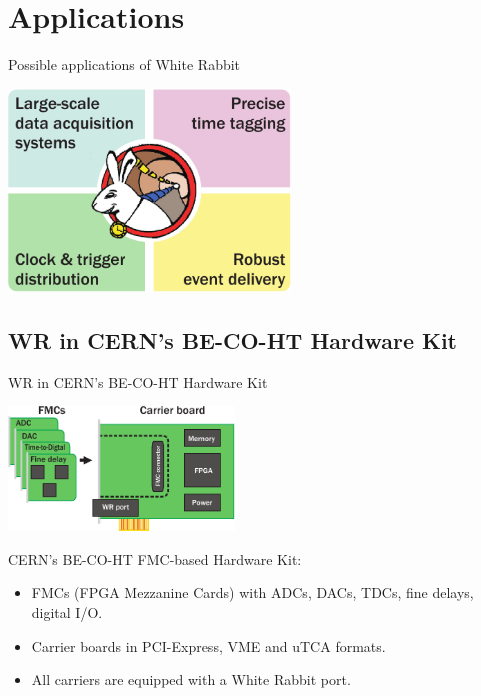 \documentclass[compress,red]{beamer}
\begin{document}
\section{Applications}

\begin{frame}{Possible applications of White Rabbit}
\begin{center}
\includegraphics[width=7.5cm]{applications/wr_apps.pdf}
\end{center}
\end{frame}


\subsection{WR in CERN's BE-CO-HT Hardware Kit}
\begin{frame}{WR in CERN's BE-CO-HT Hardware Kit}
\begin{center}

  \includegraphics[width=6cm]{node/shw_kit}

  \begin{block}{CERN's BE-CO-HT FMC-based Hardware Kit:}
    \begin{itemize}
    \item FMCs (FPGA Mezzanine Cards) with ADCs, DACs, TDCs, fine delays, digital I/O.
    \item Carrier boards in PCI-Express, VME and uTCA formats.
    \item All carriers are equipped with a White Rabbit port.
    \end{itemize}
  \end{block}

\end{center}
\end{frame}
\end{document}
